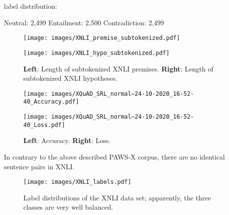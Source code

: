 


label distribution:

Neutral: 2,499
Entailment: 2,500
Contradiction: 2,499

\begin{figure}
  \begin{minipage}{0.45\linewidth}
  \vspace{0pt}
    \texttt{[image: images/XNLI\_premise\_subtokenized.pdf]}
  \end{minipage}
  \hfill
  \begin{minipage}{0.45\linewidth}
  \vspace{0pt}
    \texttt{[image: images/XNLI\_hypo\_subtokenized.pdf]}
  \end{minipage}
  \caption[XNLI Lengths]{\textbf{Left}: Length of subtokenized XNLI premises. \textbf{Right}: Length of subtokenized XNLI hypotheses.}
\end{figure}


\begin{figure}
  \begin{minipage}{0.45\linewidth}
  \vspace{0pt}
    \texttt{[image: images/XQuAD\_SRL\_normal--24-10-2020\_16-52-40\_Accuracy.pdf]}
  \end{minipage}
  \hfill
  \begin{minipage}{0.45\linewidth}
  \vspace{0pt}
    \texttt{[image: images/XQuAD\_SRL\_normal--24-10-2020\_16-52-40\_Loss.pdf]}
  \end{minipage}
  \caption[TEEEEST]{\textbf{Left}: Accuracy. \textbf{Right}: Loss.}
\end{figure}


In contrary to the above described PAWS-X corpus, there are no identical sentence pairs in XNLI.

\begin{wrapfigure}{r}{0.55\linewidth}
  \begin{center}
    \texttt{[image: images/XNLI\_labels.pdf]}
  \end{center}
  \caption[XNLI labels]{Label distributions of the XNLI data set; apparently, the three classes are very well balanced.}
\end{wrapfigure}

